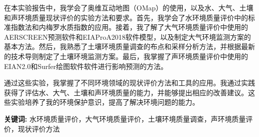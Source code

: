 \documentclass{cdut_thesis_twoside}
\begin{document}

\setcounter{page}{1}
\null\par
\begin{chineseabstract}
    在本实验报告中，我学会了奥维互动地图（OMap）的使用，以及水、大气、土壤和声环境质量现状评价的实验方法和要求。首先，我学会了水环境质量评价中的标准指数法和内梅罗水质指数的应用。接着，我了解了大气环境质量评价中使用的AERSCREEN预测软件和EIAProA2018软件模型，以及制定大气环境监测方案的基本方法。然后，我熟悉了土壤环境质量调查的布点和采样分析方法，并根据最新的技术导则制定了土壤环境监测方案。最后，我掌握了声环境质量评价中使用的EIAN2.0和Surfer绘图软件软件进行影响预测的方法。

    通过这些实验，我掌握了不同环境领域的现状评价方法和工具的应用。我通过实践获得了评估水、大气、土壤和声环境质量的能力，并能够提出相应的改善建议。这些实验培养了我的环境保护意识，提高了解决环境问题的能力。

\par              %
\null             %
\par              %
\null             %
\par              %
\noindent \textbf{\heiti 关键词:} 水环境质量评价，大气环境质量评价，土壤环境质量调查，声环境质量评价，现状评价方法    %
\end{chineseabstract}
\end{document}
